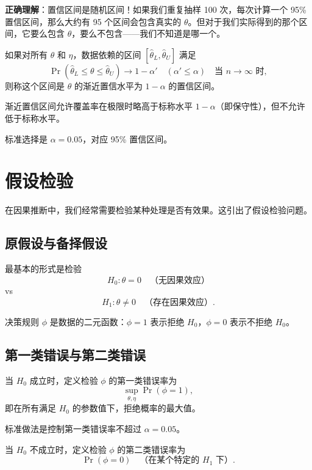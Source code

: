 \textbf{正确理解}：置信区间是随机区间！如果我们重复抽样 100 次，每次计算一个 95\% 置信区间，那么大约有 95 个区间会包含真实的 $\theta$。但对于我们实际得到的那个区间，它要么包含 $\theta$，要么不包含——我们不知道是哪一个。

\begin{Definition}[渐近置信区间]\label{def:asymptotic-confidence-interval}
如果对所有 $\theta$ 和 $\eta$，数据依赖的区间 $[\hat{\theta}_L, \hat{\theta}_U]$ 满足
\[
\Pr(\hat{\theta}_L \leq \theta \leq \hat{\theta}_U) \to 1 - \alpha' \quad (\alpha' \leq \alpha)
\quad \text{当 } n \to \infty \text{ 时},
\]
则称这个区间是 $\theta$ 的渐近置信水平为 $1-\alpha$ 的置信区间。
\end{Definition}

渐近置信区间允许覆盖率在极限时略高于标称水平 $1-\alpha$（即保守性），但不允许低于标称水平。

标准选择是 $\alpha = 0.05$，对应 95\% 置信区间。

\section{假设检验}\label{sec:hypothesis-testing}

在因果推断中，我们经常需要检验某种处理是否有效果。这引出了假设检验问题。

\subsection{原假设与备择假设}

最基本的形式是检验
\[
H_0: \theta = 0 \quad \text{（无因果效应）}
\]
vs
\[
H_1: \theta \neq 0 \quad \text{（存在因果效应）}.
\]

决策规则 $\phi$ 是数据的二元函数：$\phi = 1$ 表示拒绝 $H_0$，$\phi = 0$ 表示不拒绝 $H_0$。

\subsection{第一类错误与第二类错误}

\begin{Definition}[第一类错误率]\label{def:type-one-error}
当 $H_0$ 成立时，定义检验 $\phi$ 的第一类错误率为
\[
\sup_{\theta, \eta} \Pr(\phi = 1),
\]
即在所有满足 $H_0$ 的参数值下，拒绝概率的最大值。
\end{Definition}

标准做法是控制第一类错误率不超过 $\alpha = 0.05$。

\begin{Definition}[第二类错误率]\label{def:type-two-error}
当 $H_0$ 不成立时，定义检验 $\phi$ 的第二类错误率为
\[
\Pr(\phi = 0) \quad \text{（在某个特定的 } H_1 \text{ 下）}.
\]
\end{Definition}

